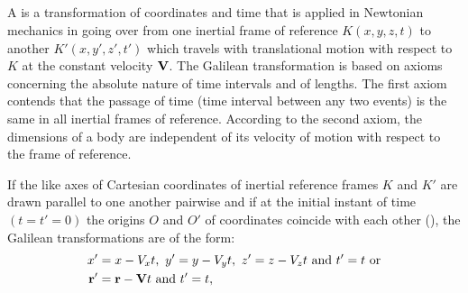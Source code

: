 \subsection{}\label{2.8.1} A  is a transformation of coordi­nates and time that is applied in Newtonian mechanics in going over from one inertial frame of reference $K (x, y, z, t)$ to another $K' (x , y', z', t')$ which travels with translational motion with respect to $K$ at the constant velocity $\vb{V}$. The Galilean transformation is based on axioms concerning the absolute nature of time intervals and of lengths. The first axiom con­tends that the passage of time (time interval between any two events) is the same in all inertial frames of reference. According to the second axiom, the dimensions of a body are independent of its velocity of motion with respect to the frame of reference.
\begin{figure}[!ht]
\centering

\end{figure}
If the like axes of Cartesian coordinates of inertial reference frames $K$ and $K'$ are drawn parallel to one another pairwise and if at the initial instant of time $(t = t' = 0)$ the origins $O$ and $O'$ of coordinates coincide with each other (), the Galilean transformations are of the form:
\begin{align*}%
x' & = x - V_{x}t,\,\, y'= y - V_{y}t,\,\, z'= z - V_{z}t\,\,\textrm{and}\,\, t'= t\,\,\textrm{or}\\
\vb{r}' & = \vb{r} - \vb{V}t\,\,\textrm{and}\,\,t' = t,
\end{align*}
